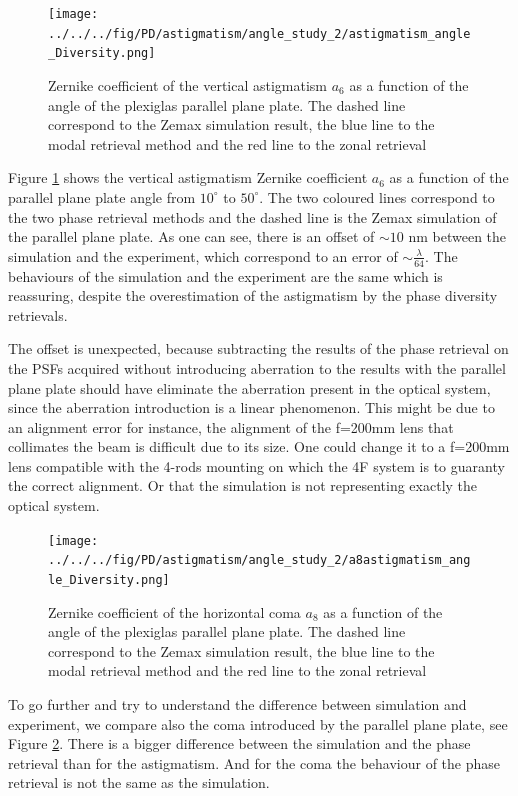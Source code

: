 \begin{figure}
\begin{center}
\texttt{[image: ../../../fig/PD/astigmatism/angle\_study\_2/astigmatism\_angle\_Diversity.png]}
\decoRule
\caption{Zernike coefficient of the vertical astigmatism $a_6$ as a function of the angle of the plexiglas parallel plane plate. The dashed line correspond to the Zemax simulation result, the blue line to the modal retrieval method and the red line to the zonal retrieval}
\label{fig:astigmatism_angle_Diversity}
\end{center}
\end{figure}

Figure \ref{fig:astigmatism_angle_Diversity} shows the vertical astigmatism Zernike coefficient $a_6$ as a function of the parallel plane plate angle from $10^{\circ}$ to $50^{\circ}$. The two coloured lines correspond to the two phase retrieval methods and the dashed line is the Zemax simulation of the parallel plane plate. As one can see, there is an offset of $\sim 10$ nm between the simulation and the experiment, which correspond to an error of $\sim\frac{\lambda}{64}$. The behaviours of the simulation and the experiment are the same which is reassuring, despite the overestimation of the astigmatism by the phase diversity retrievals. 

The offset is unexpected, because subtracting the results of the phase retrieval on the PSFs acquired without introducing aberration to the results with the parallel plane plate should have eliminate the aberration present in the optical system, since the aberration introduction is a linear phenomenon. This might be due to an alignment error for instance, the alignment of the f=200mm lens that collimates the beam is difficult due to its size. One could change it to a f=200mm lens compatible with the 4-rods mounting on which the 4F system is to guaranty the correct alignment. Or that the simulation is not representing exactly the optical system.

\begin{figure}
\begin{center}
\texttt{[image: ../../../fig/PD/astigmatism/angle\_study\_2/a8astigmatism\_angle\_Diversity.png]}
\decoRule
\caption{Zernike coefficient of the horizontal coma $a_8$ as a function of the angle of the plexiglas parallel plane plate. The dashed line correspond to the Zemax simulation result, the blue line to the modal retrieval method and the red line to the zonal retrieval}
\label{fig:a8astigmatism_angle_Diversity}
\end{center}
\end{figure}

To go further and try to understand the difference between simulation and experiment, we compare also the coma introduced by the parallel plane plate, see Figure \ref{fig:a8astigmatism_angle_Diversity}. There is a bigger difference between the simulation and the phase retrieval than for the astigmatism. And for the coma the behaviour of the phase retrieval is not the same as the simulation. 

